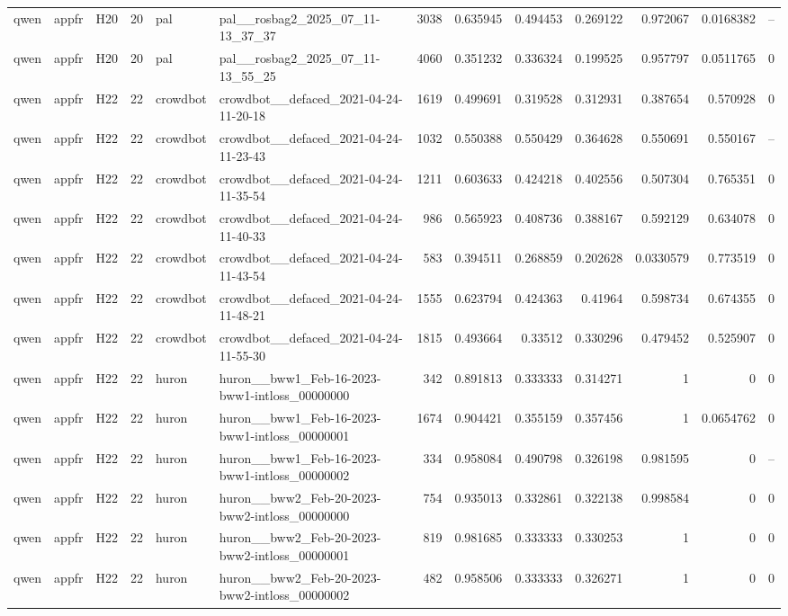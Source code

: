 \begin{longtable}{lllrllrrrrrrr}
qwen & appfr & H20 & 20 & pal & pal\_\_rosbag2\_2025\_07\_11-13\_37\_37 & 3038 & 0.635945 & 0.494453 & 0.269122 & 0.972067 & 0.0168382 & -- \\
qwen & appfr & H20 & 20 & pal & pal\_\_rosbag2\_2025\_07\_11-13\_55\_25 & 4060 & 0.351232 & 0.336324 & 0.199525 & 0.957797 & 0.0511765 & 0 \\
qwen & appfr & H22 & 22 & crowdbot & crowdbot\_\_defaced\_2021-04-24-11-20-18 & 1619 & 0.499691 & 0.319528 & 0.312931 & 0.387654 & 0.570928 & 0 \\
qwen & appfr & H22 & 22 & crowdbot & crowdbot\_\_defaced\_2021-04-24-11-23-43 & 1032 & 0.550388 & 0.550429 & 0.364628 & 0.550691 & 0.550167 & -- \\
qwen & appfr & H22 & 22 & crowdbot & crowdbot\_\_defaced\_2021-04-24-11-35-54 & 1211 & 0.603633 & 0.424218 & 0.402556 & 0.507304 & 0.765351 & 0 \\
qwen & appfr & H22 & 22 & crowdbot & crowdbot\_\_defaced\_2021-04-24-11-40-33 & 986 & 0.565923 & 0.408736 & 0.388167 & 0.592129 & 0.634078 & 0 \\
qwen & appfr & H22 & 22 & crowdbot & crowdbot\_\_defaced\_2021-04-24-11-43-54 & 583 & 0.394511 & 0.268859 & 0.202628 & 0.0330579 & 0.773519 & 0 \\
qwen & appfr & H22 & 22 & crowdbot & crowdbot\_\_defaced\_2021-04-24-11-48-21 & 1555 & 0.623794 & 0.424363 & 0.41964 & 0.598734 & 0.674355 & 0 \\
qwen & appfr & H22 & 22 & crowdbot & crowdbot\_\_defaced\_2021-04-24-11-55-30 & 1815 & 0.493664 & 0.33512 & 0.330296 & 0.479452 & 0.525907 & 0 \\
qwen & appfr & H22 & 22 & huron & huron\_\_bww1\_Feb-16-2023-bww1-intloss\_00000000 & 342 & 0.891813 & 0.333333 & 0.314271 & 1 & 0 & 0 \\
qwen & appfr & H22 & 22 & huron & huron\_\_bww1\_Feb-16-2023-bww1-intloss\_00000001 & 1674 & 0.904421 & 0.355159 & 0.357456 & 1 & 0.0654762 & 0 \\
qwen & appfr & H22 & 22 & huron & huron\_\_bww1\_Feb-16-2023-bww1-intloss\_00000002 & 334 & 0.958084 & 0.490798 & 0.326198 & 0.981595 & 0 & -- \\
qwen & appfr & H22 & 22 & huron & huron\_\_bww2\_Feb-20-2023-bww2-intloss\_00000000 & 754 & 0.935013 & 0.332861 & 0.322138 & 0.998584 & 0 & 0 \\
qwen & appfr & H22 & 22 & huron & huron\_\_bww2\_Feb-20-2023-bww2-intloss\_00000001 & 819 & 0.981685 & 0.333333 & 0.330253 & 1 & 0 & 0 \\
qwen & appfr & H22 & 22 & huron & huron\_\_bww2\_Feb-20-2023-bww2-intloss\_00000002 & 482 & 0.958506 & 0.333333 & 0.326271 & 1 & 0 & 0 \\

\end{longtable}
